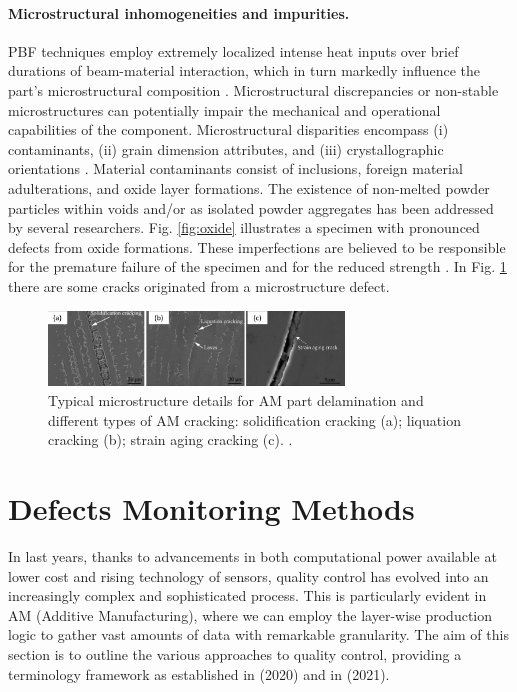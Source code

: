 \paragraph{Microstructural inhomogeneities and impurities.} PBF techniques employ extremely localized intense heat inputs over brief durations of beam-material interaction, which in turn markedly influence the part's microstructural composition \cite{thijs_study_2010}. Microstructural discrepancies or non-stable microstructures can potentially impair the mechanical and operational capabilities of the component. Microstructural disparities encompass (i) contaminants, (ii) grain dimension attributes, and (iii) crystallographic orientations \cite{dr_bree_m_sharratt_non-destructive_2015}. Material contaminants consist of inclusions, foreign material adulterations, and oxide layer formations. The existence of non-melted powder particles within voids and/or as isolated powder aggregates has been addressed by several researchers. Fig. \ref{fig:oxide} illustrates a specimen with pronounced defects from oxide formations. These imperfections are believed to be responsible for the premature failure of the specimen and for the reduced strength \cite{casati_microstructure_2016}. In Fig. \ref{fig:microstructuredefect} there are some cracks originated from a microstructure defect.
\begin{figure}
    \centering
    \includegraphics[width=0.7\textwidth]{Images/microstructure.png}
    \caption[Microstructure details.]{Typical microstructure details for AM part delamination and different types of AM cracking: solidification cracking (a); liquation cracking (b); strain aging cracking (c). \cite{mostafaei_defects_2022}.}
    \label{fig:microstructuredefect}
\end{figure}


\section{Defects Monitoring Methods}
\label{sec:comelotrovo}
In last years, thanks to advancements in both computational power available at lower cost and rising technology of sensors, quality control has evolved into an increasingly complex and sophisticated process. This is particularly evident in AM (Additive Manufacturing), where we can employ the layer-wise production logic to gather vast amounts of data with remarkable granularity. The aim of this section is to outline the various approaches to quality control, providing a terminology framework as established in \citeauthor{richard_leach_integrated_2020} (2020) and in \citeauthor{grasso_-situ_2021} (2021).

